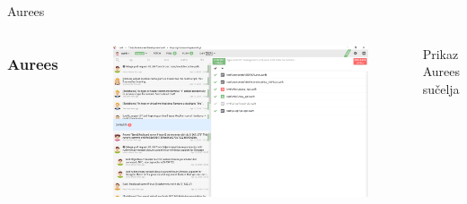 \documentclass[hyperref={bookmarks=false},aspectratio=169]{beamer}
\begin{document}
\begin{frame}{Aurees}
    
    \begin{columns}
\frametitle{Aurees}
\begin{figure}


\includegraphics[width=\columnwidth]{./figures/aurees.png}
    \centering
    
\end{figure}
    Prikaz Aurees sučelja
\end{columns}
    

\end{frame}
\end{document}
